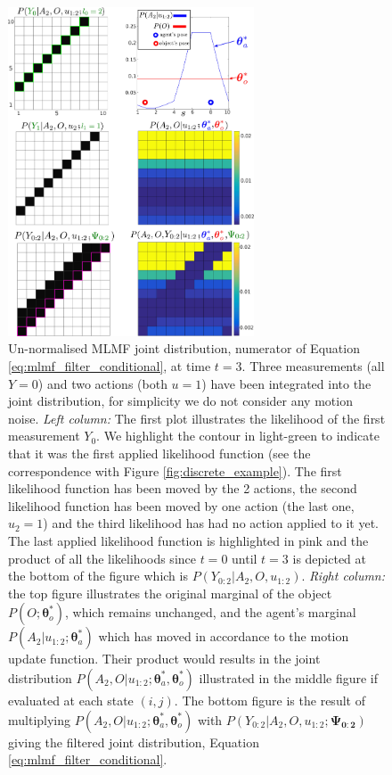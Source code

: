 \documentclass{frontiersSCNS} %
\newcommand{\ThAs}{\boldsymbol{\theta}^*_a}
\newcommand{\ThOs}{\boldsymbol{\theta}^*_o}
\begin{document}
\begin{figure}
 \centering
 \includegraphics[width=0.65\textwidth]{Figure6}
 \caption{Un-normalised MLMF joint distribution, numerator of Equation \ref{eq:mlmf_filter_conditional}, at time $t=3$.
 Three measurements (all $Y=0$) and two actions (both $u=1$) have been integrated into the joint distribution, for simplicity we do not consider any motion noise. \textit{Left column:} The first plot
 illustrates the likelihood of the first measurement $Y_0$. We highlight the contour in light-green to indicate that it was the first applied likelihood 
 function (see the correspondence with Figure \ref{fig:discrete_example}). The first likelihood function has been moved by the 2 actions, the 
 second likelihood function has been moved by one action (the last one, $u_2=1$) and the third likelihood has had no action applied to it 
 yet. The last applied likelihood function is highlighted in pink and the product of all the likelihoods since $t=0$ until $t=3$ is depicted at the 
 bottom of the figure which is $P(Y_{0:2}|A_2,O,u_{1:2})$. \textit{Right column:} the top figure illustrates the original marginal of the 
 object $P(O;\ThOs)$, which remains unchanged, and the agent's marginal $P(A_2|u_{1:2};\ThAs)$ which has moved in accordance to the motion update function. 
 Their product would results in the joint distribution $P(A_2,O|u_{1:2};\ThAs,\ThOs)$ illustrated in the middle figure if evaluated at each state $(i,j)$. The bottom figure is the result
 of multiplying $P(A_2,O|u_{1:2};\ThAs,\ThOs)$ with  $P(Y_{0:2}|A_2,O,u_{1:2};\boldsymbol{\Psi_{0:2}})$ giving the filtered joint distribution, Equation \ref{eq:mlmf_filter_conditional}.
 }
 \label{fig:maringal_joint_example_v2}
\end{figure}
\end{document}

